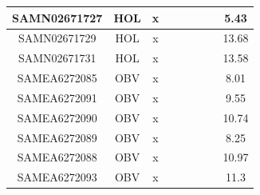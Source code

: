 \documentclass[../main.tex]{subfiles}
\begin{document}
\begin{flushleft}
\begin{footnotesize}
\begin{longtable}{|c|c|c|c|c|c|c|}
    \hline
    SAMN02671727  & HOL   & x                                                            & ~          & ~                                                                           & ~                                                                 & 5.43      \\ 
    \hline
    SAMN02671729  & HOL   & x                                                            & ~          & ~                                                                           & ~                                                                 & 13.68     \\ 
    \hline
    SAMN02671731  & HOL   & x                                                            & ~          & ~                                                                           & ~                                                                 & 13.58     \\ 
    \hline
    SAMEA6272085  & OBV   & x                                                            & ~          & ~                                                                           & ~                                                                 & 8.01      \\ 
    \hline
    SAMEA6272091  & OBV   & x                                                            & ~          & ~                                                                           & ~                                                                 & 9.55      \\ 
    \hline
    SAMEA6272090  & OBV   & x                                                            & ~          & ~                                                                           & ~                                                                 & 10.74     \\ 
    \hline
    SAMEA6272089  & OBV   & x                                                            & ~          & ~                                                                           & ~                                                                 & 8.25      \\ 
    \hline
    SAMEA6272088  & OBV   & x                                                            & ~          & ~                                                                           & ~                                                                 & 10.97     \\ 
    \hline
    SAMEA6272093  & OBV   & x                                                            & ~          & ~                                                                           & ~                                                                 & 11.3      \\ 

\end{longtable}
\end{footnotesize}
\end{flushleft}
\end{document}
